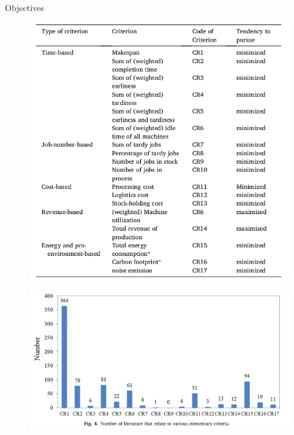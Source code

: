 \documentclass[8pt, xcolor=table]{beamer}
\begin{document}
\begin{frame}[fragile]{Objectives}
  \begin{minipage}[t]{0.55\textwidth}
    \begin{figure}[H]
      \includegraphics[width=\textwidth]{img/objective.png}
    \end{figure}
  \end{minipage}
  \begin{minipage}[t]{0.4\textwidth}
    \begin{figure}[H]
      \includegraphics[width=\textwidth]{img/Objective_distr.png}
    \end{figure}
  \end{minipage}
\end{frame}
\end{document}
